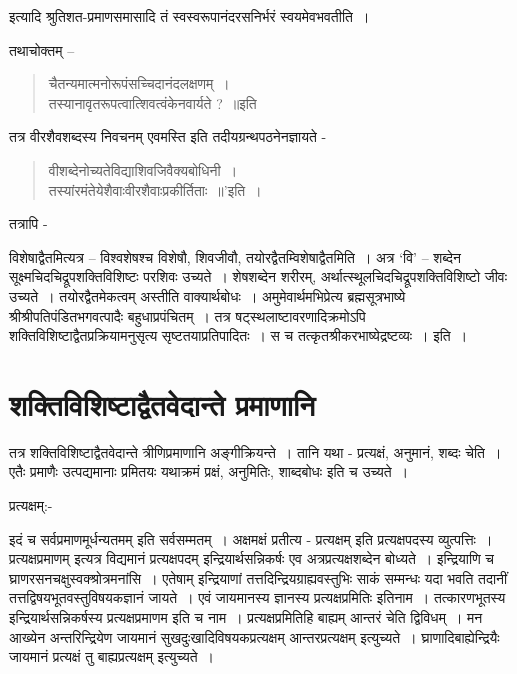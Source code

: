 {इत्यादि श्रुतिशत-प्रमाणसमासादि तं स्वस्वरूपानंदरसनिर्भरं स्वयमेवभवतीति~। 

तथाचोक्तम् –
\begin{verse}
चैतन्यमात्मनोरूपंसच्चिदानंदलक्षणम्~। \\
तस्यानावृतरूपत्वात्शिवत्वंकेनवार्यते ?~॥इति
\end{verse}
तत्र वीरशैवशब्दस्य निवचनम् एवमस्ति इति तदीयग्रन्थपठनेनज्ञायते -
\begin{verse}
वीशब्देनोच्यतेविद्याशिवजिवैक्यबोधिनी~। \\
तस्यांरमंतेयेशैवाःवीरशैवाःप्रकीर्तिताः~॥’इति~। 
\end{verse}
तत्रापि -

विशेषाद्वैतमित्यत्र – विश्वशेषश्च विशेषौ, शिवजीवौ, तयोरद्वैतम्विशेषाद्वैतमिति~। अत्र ‘वि’ – शब्देन सूक्ष्मचिदचिद्रूपशक्तिविशिष्टः परशिवः उच्यते~। शेषशब्देन शरीरम्, अर्थात्स्थूलचिदचिद्रूपशक्तिविशिष्टो जीवः उच्यते~। तयोरद्वैतमेकत्वम् अस्तीति वाक्यार्थबोधः~। अमुमेवार्थमभिप्रेत्य ब्रह्मसूत्रभाष्ये श्रीश्रीपतिपंडितभगवत्पादैः बहुधाप्रपंचितम्~। तत्र षट्स्थलाष्टावरणादिक्रमोऽपि शक्तिविशिष्टाद्वैतप्रक्रियामनुसृत्य सृष्टतयाप्रतिपादितः~। स च तत्कृतश्रीकरभाष्येद्रष्टव्यः~। इति~। 

\section*{शक्तिविशिष्टाद्वैतवेदान्ते प्रमाणानि}

तत्र शक्तिविशिष्टाद्वैतवेदान्ते त्रीणिप्रमाणानि अङ्गीक्रियन्ते~। तानि यथा - प्रत्यक्षं, अनुमानं, शब्दः चेति~। एतैः प्रमाणैः उत्पद्यमानाः प्रमितयः यथाक्रमं प्रक्षं, अनुमितिः, शाब्दबोधः इति च उच्यते~। 

प्रत्यक्षम्:-

इदं च सर्वप्रमाणमूर्धन्यतमम् इति सर्वसम्मतम्~। अक्षमक्षं प्रतीत्य - प्रत्यक्षम् इति प्रत्यक्षपदस्य व्युत्पत्तिः~। प्रत्यक्षप्रमाणम् इत्यत्र विद्यमानं प्रत्यक्षपदम् इन्द्रियार्थसन्निकर्षः एव अत्रप्रत्यक्षशब्देन बोध्यते~। इन्द्रियाणि च घ्राणरसनचक्षुस्वक्श्रोत्रमनांसि~। एतेषाम् इन्द्रियाणां तत्तदिन्द्रियग्राह्यवस्तुभिः साकं सम्मन्धः यदा भवति तदानीं तत्तद्विषयभूतवस्तुविषयकज्ञानं जायते~। एवं जायमानस्य ज्ञानस्य प्रत्यक्षप्रमितिः इतिनाम~। तत्कारणभूतस्य इन्द्रियार्थसन्निकर्षस्य प्रत्यक्षप्रमाणम इति च नाम~। प्रत्यक्षप्रमितिहि बाह्यम् आन्तरं चेति द्विविधम्~। मन आख्येन अन्तरिन्द्रियेण जायमानं सुखदुःखादिविषयकप्रत्यक्षम् आन्तरप्रत्यक्षम् इत्युच्यते~। घ्राणादिबाह्येन्द्रियैः जायमानं प्रत्यक्षं तु बाह्यप्रत्यक्षम् इत्युच्यते~। 

}
